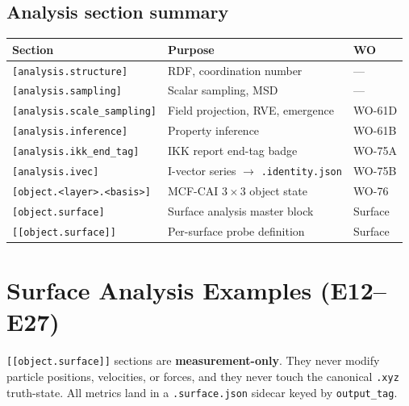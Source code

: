 \documentclass[11pt,a4paper]{article}
\begin{document}
\subsection*{Analysis section summary}

\begin{center}
\footnotesize
\begin{tabular}{@{}lll@{}}
\toprule
Section & Purpose & WO \\
\midrule
\texttt{[analysis.structure]}       & RDF, coordination number          & --- \\
\texttt{[analysis.sampling]}        & Scalar sampling, MSD              & --- \\
\texttt{[analysis.scale\_sampling]} & Field projection, RVE, emergence  & WO-61D \\
\texttt{[analysis.inference]}       & Property inference                & WO-61B \\
\texttt{[analysis.ikk\_end\_tag]}   & IKK report end-tag badge          & WO-75A \\
\texttt{[analysis.ivec]}            & I-vector series $\to$ \texttt{.identity.json} & WO-75B \\
\texttt{[object.<layer>.<basis>]}   & MCF-CAI $3\times3$ object state   & WO-76  \\
\texttt{[object.surface]}           & Surface analysis master block     & Surface \\
\texttt{[[object.surface]]}         & Per-surface probe definition      & Surface \\
\bottomrule
\end{tabular}
\end{center}

\newpage
\section*{Surface Analysis Examples (E12--E27)}

\begin{tcolorbox}[
  enhanced, breakable,
  colback=vsimdoctrinebg, colframe=vsimdoctrinetop,
  arc=3pt, boxrule=1pt,
  fonttitle=\sffamily\bfseries\small\color{white},
  title={Doctrine: Analysis-Only Probes},
]
\texttt{[[object.surface]]} sections are \textbf{measurement-only}.
They never modify particle positions, velocities, or forces, and they
never touch the canonical \texttt{.xyz} truth-state.
All metrics land in a \texttt{.surface.json} sidecar keyed by \texttt{output\_tag}.
\end{tcolorbox}
\end{document}
